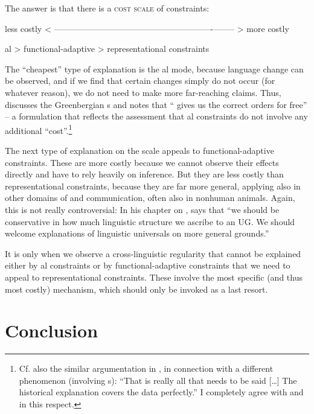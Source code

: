 \documentclass[output=paper]{langsci/langscibook}
\begin{document}
  The answer is that there is a \textsc{cost scale} of constraints:

\ea\label{ex:haspelmath:3} 
     less costly < –––––––––-------------------------------------------––––– > more costly
\begin{center}
 al > functional-adaptive > representational constraints
\end{center}
\z
\newpage
The “cheapest” type of explanation is the al mode, because language change can be observed, and if we find that certain changes simply do not occur (for whatever reason), we do not need to make more far-reaching claims. Thus, \citet[111]{Bybee2010} discusses the Greenbergian  s and notes that “ gives us the correct orders for free” – a formulation that reflects the assessment that al constraints do not involve any additional “cost”.\footnote{Cf. also the similar argumentation in \citet[33]{Kiparsky2008}, in connection with a different phenomenon (involving s): “That is really all that needs to be said […] The historical explanation covers the data perfectly.” I completely agree with  and  in this respect.}

The next type of explanation on the scale appeals to functional-adaptive constraints. These are more costly because we cannot observe their effects directly and have to rely heavily on inference. But they are less costly than representational constraints, because they are far more general, applying also in other domains of   and communication, often also in nonhuman animals. Again, this is not really controversial: In his chapter on , \citet[79]{Jackendoff2002} says that “we should be conservative in how much linguistic structure we ascribe to an  UG. We should welcome explanations of linguistic universals on more general  grounds.”

It is only when we observe a cross-linguistic regularity that cannot be explained either by al constraints or by functional-adaptive constraints that we need to appeal to representational constraints. These involve the most specific (and thus most costly) mechanism, which should only be invoked as a last resort.

\section{Conclusion}\label{sec:haspelmath:8}
\end{document}
